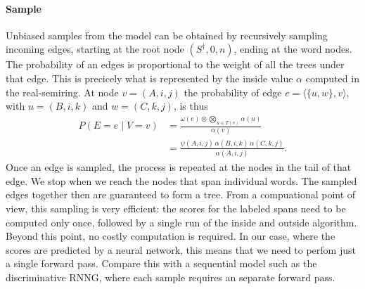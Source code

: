     \paragraph{Sample}
      Unbiased samples from the model can be obtained by recursively sampling incoming edges, starting at the root node $(S^{\dagger}, 0, n)$, ending at the word nodes. The probability of an edges is proportional to the weight of all the trees under that edge. This is precicely what is represented by the inside value $\alpha$ computed in the real-semiring. At node $v = (A, i, j)$ the probability of edge $e = \langle \{ u, w \}, v \rangle$, with $u = (B, i, k)$ and $w = (C, k, j)$, is thus
      \begin{align}
        \label{eq:sample}
        P(E = e \mid V = v)
          &= \frac{\omega(e) \otimes \bigotimes_{u \in T(e)} \alpha(u)}{\alpha(v)}  \nonumber  \\
          &= \frac{\psi(A, i, j) \, \alpha(B, i, k) \, \alpha(C, k, j)}{\alpha(A, i, j)}.
      \end{align}
      Once an edge is sampled, the process is repeated at the nodes in the tail of that edge. We stop when we reach the nodes that span individual words. The sampled edges together then are guaranteed to form a tree. From a compuational point of view, this sampling is very efficient: the scores for the labeled spans need to be computed only once, followed by a single run of the inside and outside algorithm. Beyond this point, no costly computation is required. In our case, where the scores are predicted by a neural network, this means that we need to perfom just a single forward pass. Compare this with a sequential model such as the discriminative RNNG, where each sample requires an separate forward pass.

